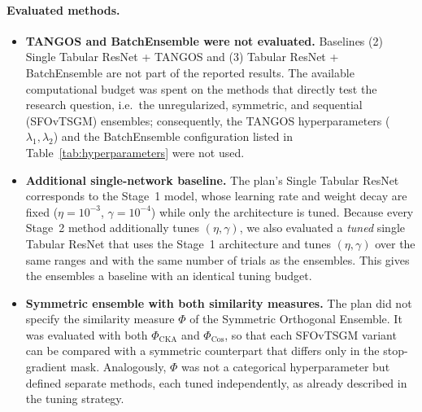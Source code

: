 \documentclass[11pt, a4paper]{article}
\begin{document}
\paragraph{Evaluated methods.}
\begin{itemize}
    \item \textbf{TANGOS and BatchEnsemble were not evaluated.} Baselines (2) Single Tabular ResNet + TANGOS \cite{jeffares2023tangos} and (3) Tabular ResNet + BatchEnsemble \cite{wen2020batchensemble} are not part of the reported results. %
    The available computational budget was spent on the methods that directly test the research question, i.e.\ the unregularized, symmetric, and sequential (SFOvTSGM) ensembles; consequently, the TANGOS hyperparameters ($\lambda_1, \lambda_2$) and the BatchEnsemble configuration listed in Table~\ref{tab:hyperparameters} were not used.
    \item \textbf{Additional single-network baseline.} The plan's Single Tabular ResNet corresponds to the Stage~1 model, whose learning rate and weight decay are fixed ($\eta = 10^{-3}$, $\gamma = 10^{-4}$) while only the architecture is tuned. Because every Stage~2 method additionally tunes $(\eta, \gamma)$, we also evaluated a \emph{tuned} single Tabular ResNet that uses the Stage~1 architecture and tunes $(\eta, \gamma)$ over the same ranges and with the same number of trials as the ensembles. This gives the ensembles a baseline with an identical tuning budget.
    \item \textbf{Symmetric ensemble with both similarity measures.} The plan did not specify the similarity measure $\Phi$ of the Symmetric Orthogonal Ensemble. It was evaluated with both $\Phi_{\text{CKA}}$ and $\Phi_{\text{Cos}}$, so that each SFOvTSGM variant can be compared with a symmetric counterpart that differs only in the stop-gradient mask. Analogously, $\Phi$ was not a categorical hyperparameter but defined separate methods, each tuned independently, as already described in the tuning strategy.

\end{itemize}
\end{document}
